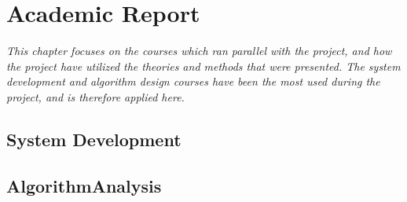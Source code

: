 \chapter{Academic Report}

\textit{This chapter focuses on the courses which ran parallel with the project, and how the project have utilized the theories and methods that were presented. The system development and algorithm design courses have been the most used during the project, and is therefore applied here.}

\section{System Development}
\label{SystemDev}

\section{AlgorithmAnalysis}
\label{AlgorithmAnalysis}
